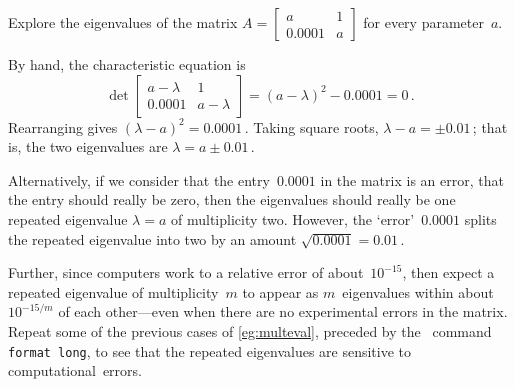 \begin{example} \label{eg:}
Explore the eigenvalues of the matrix
\(A=\begin{bmatrix} a&1\\0.0001&a \end{bmatrix}\) for every parameter~\(a\).
\begin{solution} 
By hand, the characteristic equation is
\begin{equation*}
\det\begin{bmatrix} a-\lambda&1\\0.0001&a-\lambda \end{bmatrix}
=(a-\lambda)^2-0.0001=0\,.
\end{equation*}
Rearranging gives \((\lambda-a)^2=0.0001\)\,.
Taking square roots, \(\lambda-a=\pm0.01\)\,; that is, the two eigenvalues are \(\lambda=a\pm0.01\)\,.

Alternatively, if we consider that the entry~\(0.0001\) in the matrix is an error, that the entry should really be zero, then the eigenvalues should really be one repeated eigenvalue \(\lambda=a\) of multiplicity two.
However, the `error'~\(0.0001\) splits the repeated eigenvalue into two by an amount \(\sqrt{0.0001}=0.01\)\,.
\end{solution}
\end{example}


Further, since computers work to a relative error of about~\(10^{-15}\), then expect a repeated eigenvalue of multiplicity~\(m\) to appear as \(m\)~eigenvalues within about~\(10^{-15/m}\) of each other---even when there are no experimental errors in the matrix.
Repeat some of the previous cases of \autoref{eg:multeval}, preceded by the \script\ command \verb|format long|, to see that the repeated eigenvalues are sensitive to computational~errors.



